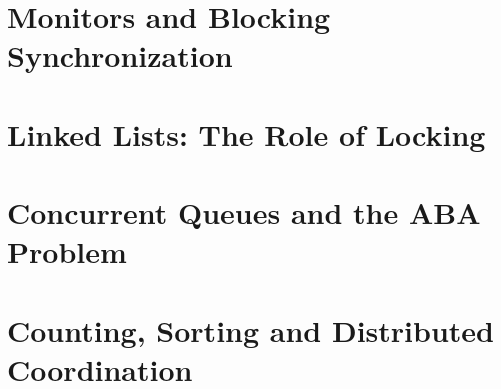\documentclass[letter,12pt]{report}
\begin{document}
\chapter{Monitors and Blocking Synchronization}



\chapter{Linked Lists: The Role of Locking}


%
%


\chapter{Concurrent Queues and the ABA Problem}





\chapter{Counting, Sorting and Distributed Coordination}

\end{document}
